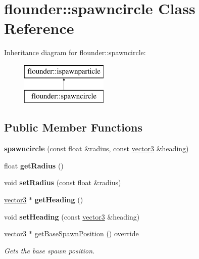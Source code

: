 \hypertarget{classflounder_1_1spawncircle}{}\section{flounder\+:\+:spawncircle Class Reference}
\label{classflounder_1_1spawncircle}
Inheritance diagram for flounder\+:\+:spawncircle\+:\begin{figure}[H]
\begin{center}
\leavevmode
\includegraphics[height=2.000000cm]{classflounder_1_1spawncircle}
\end{center}
\end{figure}
\subsection*{Public Member Functions}
\begin{DoxyCompactItemize}
\item 
\mbox{\label{classflounder_1_1spawncircle_aa08a086e39288a2be5c0a66d1fb02d3c}} 
{\bfseries spawncircle} (const float \&radius, const \hyperlink{classflounder_1_1vector3}{vector3} \&heading)
\item 
\mbox{\label{classflounder_1_1spawncircle_a2a8a67865376fa4d5203a932d2210a3e}} 
float {\bfseries get\+Radius} ()
\item 
\mbox{\label{classflounder_1_1spawncircle_a9ca289dd4636b5dafeec0feae78ae83b}} 
void {\bfseries set\+Radius} (const float \&radius)
\item 
\mbox{\label{classflounder_1_1spawncircle_abda686e7f9a0b5ee7b4b435dc1b71171}} 
\hyperlink{classflounder_1_1vector3}{vector3} $\ast$ {\bfseries get\+Heading} ()
\item 
\mbox{\label{classflounder_1_1spawncircle_a23d71f2216b0ca2b6c526c35264f5e33}} 
void {\bfseries set\+Heading} (const \hyperlink{classflounder_1_1vector3}{vector3} \&heading)
\item 
\hyperlink{classflounder_1_1vector3}{vector3} $\ast$ \hyperlink{classflounder_1_1spawncircle_a1a637319942ae68475e7b0b0f3e0a739}{get\+Base\+Spawn\+Position} () override
\begin{DoxyCompactList}\small\item\em Gets the base spawn position. \end{DoxyCompactList}\end{DoxyCompactItemize}
